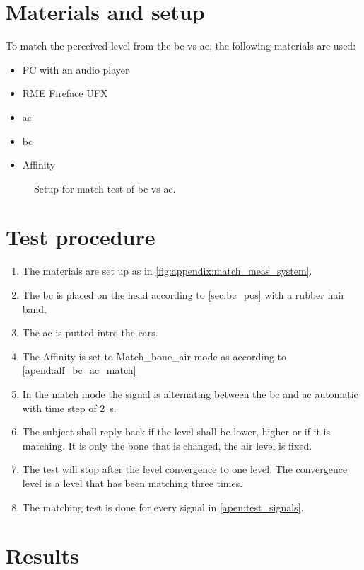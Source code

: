 \section*{Materials and setup}
To match the perceived level from the \gls{bc} vs \gls{ac}, the following materials are used:
\begin{itemize}
\item PC with an audio player
\item RME Fireface UFX
\item \gls{ac}
\item \gls{bc}
\item Affinity
\end{itemize}

\begin{figure}[H]
\centering
\def\svgwidth{\columnwidth}

\caption{Setup for match test of \gls{bc} vs \gls{ac}.}
		\label{fig:appendix:match_meas_system}
\end{figure}

\section*{Test procedure}


\begin{enumerate}
\item The materials are set up as in \autoref{fig:appendix:match_meas_system}.
\item The \gls{bc} is placed on the head according to \autoref{sec:bc_pos} with a rubber hair band.
\item The \gls{ac} is putted intro the ears.
\item The Affinity is set to Match_bone_air mode as according to \autoref{apend:aff_bc_ac_match} 
\item In the match mode the signal is alternating between the \gls{bc} and \gls{ac} automatic with time step of \SI{2}{\second}.
\item The  subject shall reply back if the level shall be lower, higher or if it is matching. It is only the bone that is changed, the air level is fixed.
\item The test will stop after the level convergence to one level. The convergence level is a level that has been matching three times.
\item The matching test is done for every signal in \autoref{apen:test_signals}.
\end{enumerate}

\section*{Results}

